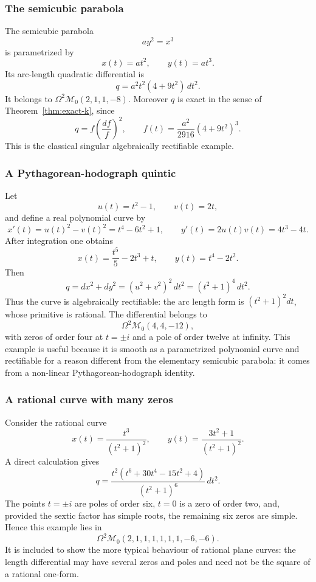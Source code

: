 \documentclass[reqno]{amsart}
\theoremstyle{definition}
\theoremstyle{remark}
\theoremstyle{definition}
\theoremstyle{definition}
\theoremstyle{definition}
\begin{document}
\subsubsection{The semicubic parabola}

The semicubic parabola
\[
        ay^{2}=x^{3}
\]
is parametrized by
\[
        x(t)=at^{2},\qquad y(t)=at^{3}.
\]
Its arc-length quadratic differential is
\[
        q=a^{2}t^{2}(4+9t^{2})\,dt^{2}.
\]
It belongs to $\Omega^{2}\mathcal{M}_{0}(2,1,1,-8)$.  Moreover $q$ is exact in
the sense of Theorem~\ref{thm:exact-k}, since
\[
        q=f\left(\frac{df}{f}\right)^{2},\qquad
        f(t)=\frac{a^{2}}{2916}(4+9t^{2})^{3}.
\]
This is the classical singular algebraically rectifiable example.

\subsubsection{A Pythagorean-hodograph quintic}

Let
\[
        u(t)=t^{2}-1,\qquad v(t)=2t,
\]
and define a real polynomial curve by
\[
        x'(t)=u(t)^{2}-v(t)^{2}=t^{4}-6t^{2}+1,
        \qquad
        y'(t)=2u(t)v(t)=4t^{3}-4t.
\]
After integration one obtains
\[
        x(t)=\frac{t^{5}}5-2t^{3}+t,
        \qquad
        y(t)=t^{4}-2t^{2}.
\]
Then
\[
        q=dx^{2}+dy^{2}=(u^{2}+v^{2})^{2}\,dt^{2}=(t^{2}+1)^{4}\,dt^{2}.
\]
Thus the curve is algebraically rectifiable: the arc length form is
$(t^{2}+1)^{2}dt$, whose primitive is rational.  The differential belongs to
\[
        \Omega^{2}\mathcal{M}_{0}(4,4,-12),
\]
with zeros of order four at $t=\pm i$ and a pole of order twelve at infinity.
This example is useful because it is smooth as a parametrized polynomial curve
and rectifiable for a reason different from the elementary semicubic parabola:
it comes from a non-linear Pythagorean-hodograph identity.

\subsubsection{A rational curve with many zeros}

Consider the rational curve
\[
        x(t)=\frac{t^{3}}{(t^{2}+1)^{2}},\qquad
        y(t)=\frac{3t^{2}+1}{(t^{2}+1)^{2}}.
\]
A direct calculation gives
\[
        q=\frac{t^{2}(t^{6}+30t^{4}-15t^{2}+4)}{(t^{2}+1)^{6}}\,dt^{2}.
\]
The points $t=\pm i$ are poles of order six, $t=0$ is a zero of order two,
and, provided the sextic factor has simple roots, the remaining six zeros are
simple.  Hence this example lies in
\[
        \Omega^{2}\mathcal{M}_{0}(2,1,1,1,1,1,1,-6,-6).
\]
It is included to show the more typical behaviour of rational plane curves:
the length differential may have several zeros and poles and need not be the
square of a rational one-form.
\end{document}
